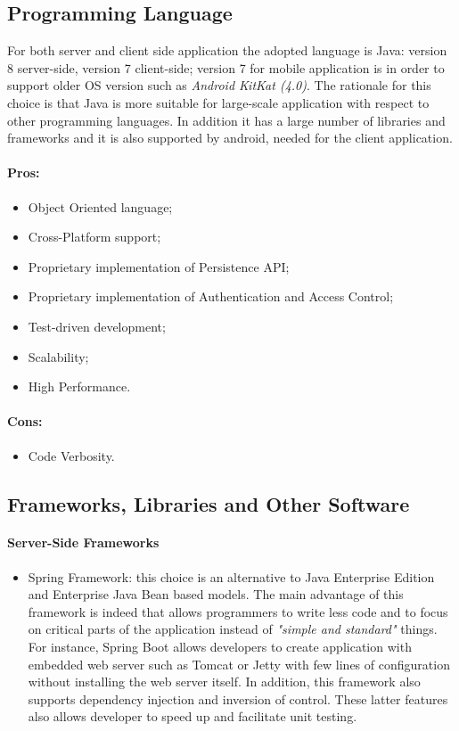 \documentclass[a4paper]{article}
\begin{document}
\subsection{Programming Language}
For both server and client side application the adopted language is Java: version 8 server-side, version 7 client-side; version 7 for mobile application is in order to support older OS version such as \textit{Android KitKat (4.0)}. The rationale for this choice is that Java is more suitable for large-scale application with respect to other programming languages. In addition it has a large number of libraries and frameworks and it is also supported by android, needed for the client application.

\paragraph{Pros:}

\begin{itemize}
    \item Object Oriented language;
    \item Cross-Platform support;
    \item Proprietary implementation of Persistence API;
    \item Proprietary implementation of Authentication and Access Control;
    \item Test-driven development;
    \item Scalability;
    \item High Performance.
\end{itemize}

\paragraph{Cons:}
\begin{itemize}
    \item Code Verbosity.
\end{itemize}

\subsection{Frameworks, Libraries and Other Software}

\paragraph{Server-Side Frameworks}
\begin{itemize}
    \item Spring Framework: this choice is an alternative to Java Enterprise Edition and Enterprise Java Bean based models. The main advantage of this framework is indeed that allows programmers to write less code and to focus on critical parts of the application instead of \textit{"simple and standard"} things. For instance, Spring Boot allows developers to create application with embedded web server such as Tomcat or Jetty with few lines of configuration without installing the web server itself. In addition, this framework also supports dependency injection and inversion of control. These latter features also allows developer to speed up and facilitate unit testing.
\end{itemize}
\end{document}
